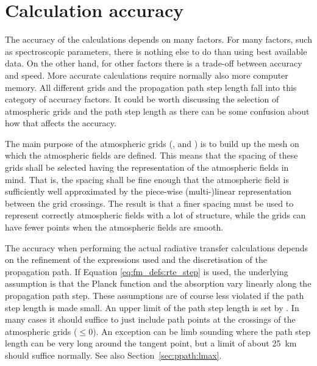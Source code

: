 \section{Calculation accuracy}
\label{sec:fm_defs:accuracy}

The accuracy of the calculations depends on many factors. For many
factors, such as spectroscopic parameters, there is nothing else to do
than using best available data. On the other hand, for other factors
there is a trade-off between accuracy and speed. More accurate
calculations require normally also more computer memory. All
different grids and the propagation path step length fall into this
category of accuracy factors. It could be worth discussing the
selection of atmospheric grids and the path step length as there can
be some confusion about how that affects the accuracy.

The main purpose of the atmospheric grids (,
 and ) is to build up the
mesh on which the atmospheric fields are defined. This means that the
spacing of these grids shall be selected having the representation of
the atmospheric fields in mind. That is, the spacing shall be fine
enough that the atmospheric field is sufficiently well approximated by
the piece-wise (multi-)linear representation between the grid
crossings. The result is that a finer spacing must be used to
represent correctly atmospheric fields with a lot of structure, while
the grids can have fewer points when the atmospheric fields are
smooth. 

The accuracy when performing the actual radiative transfer calculations depends
on the refinement of the expressions used and the discretisation of the
propagation path. If Equation \ref{eq:fm_defs:rte_step} is used, the
underlying assumption is that the Planck function and the absorption vary
linearly along the propagation path step. These assumptions are of course less
violated if the path step length is made small. An upper limit of the path step
length is set by . In many cases it should suffice to
just include path points at the crossings of the atmospheric grids
($\leq0$). An exception can be limb sounding where the
path step length can be very long around the tangent point, but a limit of
about 25~km should suffice normally. See also Section~\ref{sec:ppath:lmax}.


